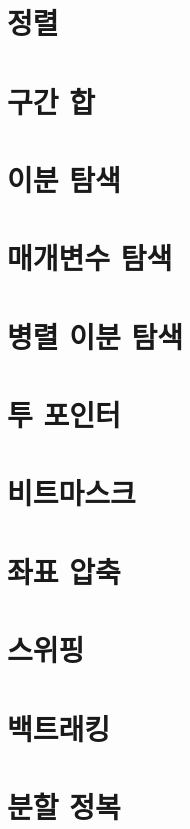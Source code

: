 \chapter{정렬}


\chapter{구간 합}


\chapter{이분 탐색}


\chapter{매개변수 탐색}


\chapter{병렬 이분 탐색}


\chapter{투 포인터}


\chapter{비트마스크}


\chapter{좌표 압축}


\chapter{스위핑}


\chapter{백트래킹}


\chapter{분할 정복}
